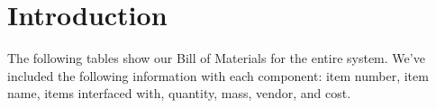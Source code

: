 \documentclass[]{auvsi_doc}
\begin{document}
	\begin{AUVSITitlePage}
		\begin{artifacttable}
		\end{artifacttable}
	\end{AUVSITitlePage}

	\section{Introduction}
	The following tables show our Bill of Materials for the entire system. We've included the following information with each component: item number, item name, items interfaced with, quantity, mass, vendor, and cost.
\end{document}
